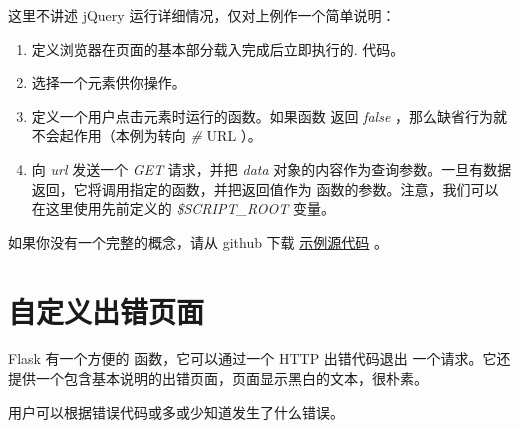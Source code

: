 \documentclass[a4paper,12pt]{sphinxmanual}
\begin{document}
这里不讲述 jQuery 运行详细情况，仅对上例作一个简单说明：
\begin{enumerate}
\item {} 
 定义浏览器在页面的基本部分载入完成后立即执行的.
代码。

\item {} 
 选择一个元素供你操作。

\item {} 
 定义一个用户点击元素时运行的函数。如果函数
返回 \emph{false} ，那么缺省行为就不会起作用（本例为转向 \emph{\#} URL ）。

\item {} 
 向 \emph{url} 发送一个 \emph{GET} 请求，并把 \emph{data}
对象的内容作为查询参数。一旦有数据返回，它将调用指定的函数，并把返回值作为
函数的参数。注意，我们可以在这里使用先前定义的 \emph{\$SCRIPT\_ROOT} 变量。

\end{enumerate}

如果你没有一个完整的概念，请从 github 下载 \href{http://github.com/mitsuhiko/flask/tree/master/examples/jqueryexample}{示例源代码} 。


\section{自定义出错页面}
\label{patterns/errorpages::doc}\label{patterns/errorpages:id1}
Flask 有一个方便的 {\hyperref[api:flask.abort]{}} 函数，它可以通过一个 HTTP 出错代码退出
一个请求。它还提供一个包含基本说明的出错页面，页面显示黑白的文本，很朴素。

用户可以根据错误代码或多或少知道发生了什么错误。
\end{document}
